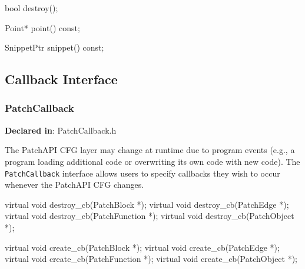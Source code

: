 \begin{apient}
bool destroy();
\end{apient}



\begin{apient}
Point* point() const;
\end{apient}



\begin{apient}
SnippetPtr snippet() const;
\end{apient}



\subsection{Callback Interface}
\label{sec-3.1}


\subsubsection{PatchCallback}
\label{sec-3.2.7}

\textbf{Declared in}: PatchCallback.h

The PatchAPI CFG layer may change at runtime due to program events
(e.g., a program loading additional code or overwriting its own code
with new code). The \texttt{PatchCallback} interface allows users to
specify callbacks they wish to occur whenever the PatchAPI CFG
changes.

\begin{apient}
virtual void destroy_cb(PatchBlock *);
virtual void destroy_cb(PatchEdge *);
virtual void destroy_cb(PatchFunction *);
virtual void destroy_cb(PatchObject *);
\end{apient}



\begin{apient}
virtual void create_cb(PatchBlock *);
virtual void create_cb(PatchEdge *);
virtual void create_cb(PatchFunction *);
virtual void create_cb(PatchObject *);
\end{apient}


